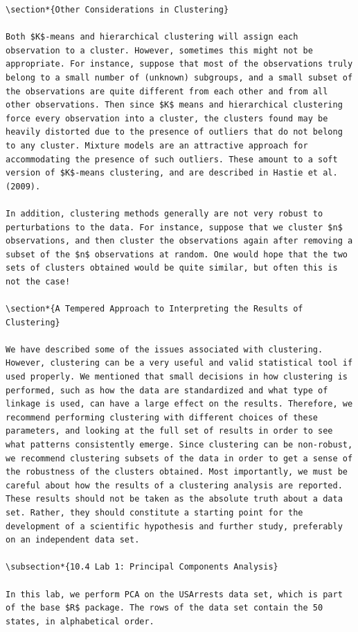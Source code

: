 \documentclass[10pt]{article}
\begin{document}
\begin{verbatim}
\section*{Other Considerations in Clustering}

Both $K$-means and hierarchical clustering will assign each observation to a cluster. However, sometimes this might not be appropriate. For instance, suppose that most of the observations truly belong to a small number of (unknown) subgroups, and a small subset of the observations are quite different from each other and from all other observations. Then since $K$ means and hierarchical clustering force every observation into a cluster, the clusters found may be heavily distorted due to the presence of outliers that do not belong to any cluster. Mixture models are an attractive approach for accommodating the presence of such outliers. These amount to a soft version of $K$-means clustering, and are described in Hastie et al. (2009).

In addition, clustering methods generally are not very robust to perturbations to the data. For instance, suppose that we cluster $n$ observations, and then cluster the observations again after removing a subset of the $n$ observations at random. One would hope that the two sets of clusters obtained would be quite similar, but often this is not the case!

\section*{A Tempered Approach to Interpreting the Results of Clustering}

We have described some of the issues associated with clustering. However, clustering can be a very useful and valid statistical tool if used properly. We mentioned that small decisions in how clustering is performed, such as how the data are standardized and what type of linkage is used, can have a large effect on the results. Therefore, we recommend performing clustering with different choices of these parameters, and looking at the full set of results in order to see what patterns consistently emerge. Since clustering can be non-robust, we recommend clustering subsets of the data in order to get a sense of the robustness of the clusters obtained. Most importantly, we must be careful about how the results of a clustering analysis are reported. These results should not be taken as the absolute truth about a data set. Rather, they should constitute a starting point for the development of a scientific hypothesis and further study, preferably on an independent data set.

\subsection*{10.4 Lab 1: Principal Components Analysis}

In this lab, we perform PCA on the USArrests data set, which is part of the base $R$ package. The rows of the data set contain the 50 states, in alphabetical order.
\end{verbatim}
\end{document}
